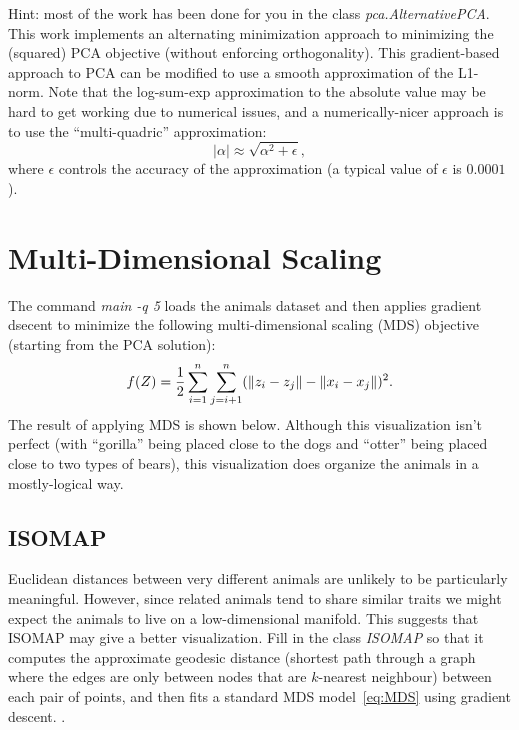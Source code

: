\documentclass{article}
\begin{document}
Hint: most of the work has been done for you in the class \emph{pca.AlternativePCA}. 
This work implements an alternating minimization approach to minimizing the (squared) PCA objective (without enforcing orthogonality). This gradient-based approach to PCA can be modified to use a smooth approximation of the L1-norm. Note that the log-sum-exp approximation to the absolute value may be hard to get working due to numerical issues, and a numerically-nicer approach is to use the ``multi-quadric'' approximation:
\[
|\alpha| \approx \sqrt{\alpha^2 + \epsilon},
\]
where $\epsilon$ controls the accuracy of the approximation (a typical value of $\epsilon$ is $0.0001$).





\section{Multi-Dimensional Scaling}

The command \emph{main -q 5} loads the animals dataset and then applies gradient dsecent to minimize the following multi-dimensional scaling (MDS) objective (starting from the PCA solution):
\begin{equation}
\label{eq:MDS}
f(Z) =  \frac{1}{2}\sum_{i=1}^n\sum_{j=i+1}^n (  \|z_i - z_j\| - \|x_i - x_j\|)^2.
\end{equation}
 The result of applying MDS is shown below.
Although this visualization isn't perfect (with ``gorilla'' being placed close to the dogs and ``otter'' being placed close to two types of bears), this visualization does organize the animals in a mostly-logical way.


\subsection{ISOMAP}

Euclidean distances between very different animals are unlikely to be particularly meaningful. 
However, since related animals tend to share similar traits we might expect the animals to live on a low-dimensional manifold. 
This suggests that ISOMAP may give a better visualization. 
Fill in the class \emph{ISOMAP} so that it computes the approximate geodesic distance 
(shortest path through a graph where the edges are only between nodes that are $k$-nearest neighbour) between each pair of points, 
and then fits a standard MDS model~\eqref{eq:MDS} using gradient descent. .
\end{document}
